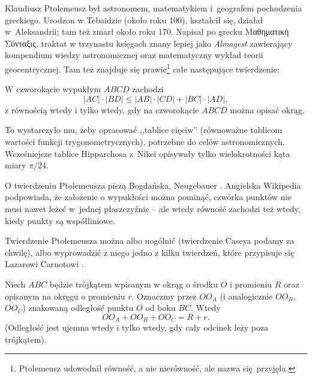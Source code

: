 
Klaudiusz Ptolemeusz był astronomem, matematykiem i~geografem pochodzenia greckiego.
%
Urodzon w Tebaidzie (około roku 100), kształcił się, działał w~Aleksandrii; tam też zmarł około roku 170.
Napisał po grecku Μαθηματικὴ Σύνταξις, traktat w trzynastu księgach znany lepiej jako \emph{Almagest} zawierający kompendium wiedzy astronomicznej oraz matematyczny wykład teorii geocentrycznej.
Tam też znajduje się prawie\footnote{Ptolemeusz udowodnił równość, a nie nierówność, ale nazwa się przyjęła.} całe następujące twierdzenie:

\begin{theorem}[Ptolemeusza, 140 r.n.e.]
%
%
    W czworokącie wypukłym $ABCD$ zachodzi
    \begin{equation}
        |AC| \cdot |BD| \le |AB| \cdot |CD| + |BC| \cdot |AD|,
    \end{equation}
    z równością wtedy i tylko wtedy, gdy na czworokącie $ABCD$ można opisać okrąg.
\end{theorem}

To wystarczyło mu, żeby opracować ,,tablice cięciw'' (równoważne tablicom wartości funkcji trygonometrycznych), potrzebne do celów astronomicznych.
Wcześniejsze tablice Hipparchosa z~Nikei opisywały tylko wielokrotności kąta miary $\pi/24$.
%

O twierdzeniu Ptolemeusza piszą Bogdańska, Neugebauer \cite[s. 62, 63]{neugebauer_2018}.
Angielska Wikipedia podpowiada, że założenie o wypukłości można pominąć, czwórka punktów nie musi nawet leżeć w~jednej płaszczyźnie -- ale wtedy równość zachodzi też wtedy, kiedy punkty są współliniowe.

Twierdzenie Ptolemeusza można albo uogólnić (twierdzenie Caseya podamy za chwilę), albo wyprowadzić z niego jedno z kilku twierdzeń, które przypisuje się Lazarowi Carnotowi \cite{carnot_1803}.

\begin{theorem}[Carnot, 1803?]
    Niech $ABC$ będzie trójkątem wpisanym w okrąg o środku $O$ i promieniu $R$ oraz opisanym na okręgu o promieniu $r$.
    Oznaczmy przez $OO_A$ (i analogicznie $OO_B$, $OO_C$) znakowaną odległość punktu $O$ od boku $BC$.
    Wtedy 
    \begin{equation}
        OO_A + OO_B + OO_C = R + r.
    \end{equation}
    (Odległość jest ujemna wtedy i tylko wtedy, gdy cały odcinek leży poza trójkątem).
\end{theorem}

